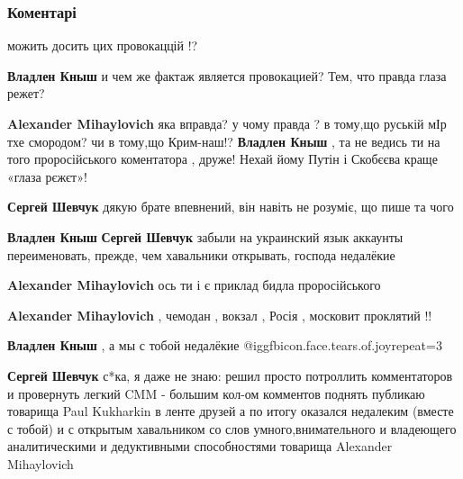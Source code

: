  
 
 
 
 
\subsubsection{Коментарі}
\label{sec:22_08_2021.fb.kuharkin_pavel.1.sevastopol_torelantnost.cmt}

\begin{itemize} %
можить досить цих провокаццій !?

\begin{itemize} %
\textbf{Владлен Кныш} и чем же фактаж является провокацией? Тем, что правда глаза режет?

\textbf{Alexander Mihaylovich} яка вправда? у чому правда ? в тому,що руській мІр тхе смородом? чи в тому,що Крим-наш!?
\textbf{Владлен Кныш} , та не ведись ти на того проросійського коментатора , друже!
Нехай йому Путін і Скобєєва краще «глаза рєжєт»!

\textbf{Сергей Шевчук} дякую брате
впевнений, він навіть не розуміє, що пише та чого

\textbf{Владлен Кныш} \textbf{Сергей Шевчук} забыли на украинский язык аккаунты переименовать, прежде, чем хавальники открывать, господа недалёкие

\textbf{Alexander Mihaylovich} ось ти і є приклад бидла проросійського

\textbf{Alexander Mihaylovich} , чемодан , вокзал , Росія , московит проклятий !!

\textbf{Владлен Кныш} , а мы с тобой недалёкие  @igg{fbicon.face.tears.of.joy}{repeat=3} 

\textbf{Сергей Шевчук} с*ка, я даже не знаю: решил просто потроллить комментаторов и провернуть легкий CMM - большим кол-ом комментов поднять публикаю товарища Paul Kukharkin в ленте друзей
а по итогу оказался недалеким (вместе с тобой) и с открытым хавальником со слов умного,внимательного и владеющего аналитическими и дедуктивными способностями товарища Alexander Mihaylovich


\end{itemize}
\end{itemize}
